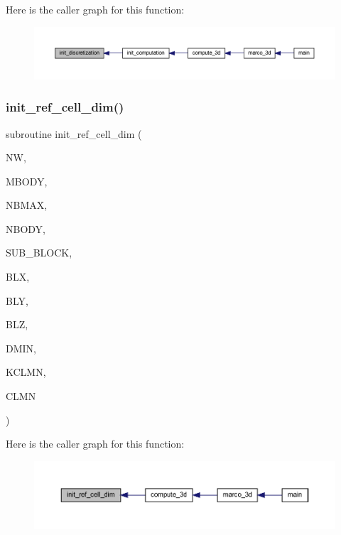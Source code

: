 Here is the caller graph for this function\+:
\nopagebreak
\begin{figure}[H]
\begin{center}
\leavevmode
\includegraphics[width=350pt]{Marco_8f90_aca2a0c5479ec07e65782fa62da433365_icgraph}
\end{center}
\end{figure}
\mbox{\label{Marco_8f90_abe7f527d74ea96643956d52265c43729}} 
\subsubsection{\texorpdfstring{init\+\_\+ref\+\_\+cell\+\_\+dim()}{init\_ref\_cell\_dim()}}
{\footnotesize\ttfamily subroutine init\+\_\+ref\+\_\+cell\+\_\+dim (\begin{DoxyParamCaption}\item[{integer}]{NW,  }\item[{integer}]{M\+B\+O\+DY,  }\item[{integer}]{N\+B\+M\+AX,  }\item[{integer}]{N\+B\+O\+DY,  }\item[{integer, dimension(mbody)}]{S\+U\+B\+\_\+\+B\+L\+O\+CK,  }\item[{real, dimension(nbmax,mbody)}]{B\+LX,  }\item[{real, dimension(nbmax,mbody)}]{B\+LY,  }\item[{real, dimension(nbmax,mbody)}]{B\+LZ,  }\item[{real}]{D\+M\+IN,  }\item[{integer}]{K\+C\+L\+MN,  }\item[{real, dimension(mbody)}]{C\+L\+MN }\end{DoxyParamCaption})}

Here is the caller graph for this function\+:
\nopagebreak
\begin{figure}[H]
\begin{center}
\leavevmode
\includegraphics[width=350pt]{Marco_8f90_abe7f527d74ea96643956d52265c43729_icgraph}
\end{center}
\end{figure}
\mbox{\label{Marco_8f90_a0ba9e9f35837a34d8df25a815723376a}} 
